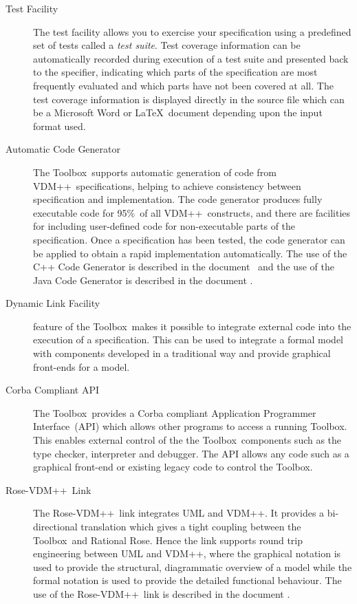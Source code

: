 \documentclass[\pformat,12pt]{article}
\def\vdmpp{{\small VDM}++}
\newcommand{\vdmslpp}{VDM++}
\newcommand{\Toolbox}{Toolbox}
\begin{document}
\begin{description}
\item[Test Facility] The test facility allows you to exercise your
  specification using a predefined set of tests called a {\em test
    suite\/}. Test coverage information can be automatically recorded
  during execution of a test suite and presented back to the
  specifier, indicating which parts of the specification are most
  frequently evaluated and which parts have not been covered at all.
  The test coverage information is displayed directly in the source
  file which can be a Microsoft Word or \LaTeX\ document depending
  upon the input format used.

\item[Automatic Code Generator] The \Toolbox\ supports automatic
  generation of  code
  from \vdmslpp\ specifications, helping to achieve
  consistency between specification and implementation. The code
  generator produces fully executable code for 95\%\ of all \vdmslpp\
  constructs, and there are facilities for including user-defined code
  for non-executable parts of the specification.  Once a specification
  has been tested, the code generator can be applied to obtain a rapid
  implementation automatically. The use of the C++ Code Generator is
  described in the document
\ and the use of the Java Code Generator is described in the document
\cite{CGJavaManPP-SCSK}%
.

\item[Dynamic Link Facility] feature of the
  \Toolbox\ makes it possible to integrate external code into the
  execution of a specification.  This can be used to integrate a
  formal model with components developed in a traditional way and
  provide graphical front-ends for a model.  

\item[Corba Compliant API] The \Toolbox\ provides a Corba compliant
  Application Programmer Interface~(API) which allows other programs
  to access a running \Toolbox. This enables external control of the
  the \Toolbox\ components such as the type checker, interpreter and
  debugger. The API allows any code such as a graphical front-end or
  existing legacy code to control the \Toolbox.

\item[Rose-\vdmpp\ Link] The Rose-\vdmpp\ link integrates UML and
  \vdmpp.  It provides a bi-directional translation which gives a
  tight coupling between the \Toolbox\ and Rational Rose. Hence the
  link supports round trip engineering between UML and \vdmpp, where
  the graphical notation is used to provide the structural,
  diagrammatic overview of a model while the formal notation is used
  to provide the detailed functional behaviour. The use of
  the Rose-\vdmpp\ link is described in the document \cite{UMLMan-SCSK}.


\end{description}
\end{document}
